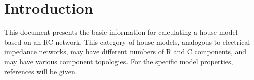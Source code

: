 \section{Introduction}

This document presents the basic information for calculating a house model based on an RC network. 
This category of house models, analogous to electrical impedance networks, may have different numbers of R and C components, and may have various component topologies. 
For the specific model properties, references will be given.
